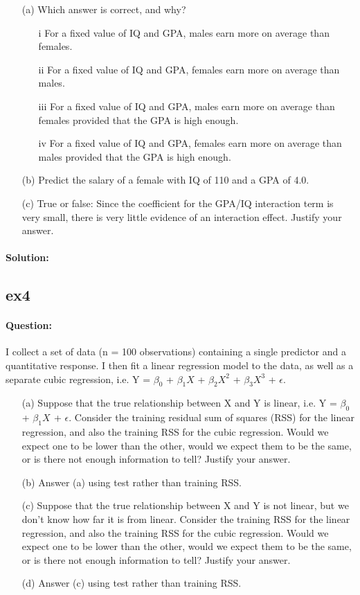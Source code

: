 \documentclass[a4paper,12pt,titlepage]{article} %
\begin{document}
\begin{itemize}
	\item[(a)] Which answer is correct, and why?
	\begin{itemize}
		\item[i] For a fixed value of IQ and GPA, males earn more on average than females.
		\item[ii] For a fixed value of IQ and GPA, females earn more on average than males.
		\item[iii] For a fixed value of IQ and GPA, males earn more on average than females provided that the GPA is high enough.
		\item[iv] For a fixed value of IQ and GPA, females earn more on average than males provided that the GPA is high enough.
	\end{itemize}
	\item[(b)] Predict the salary of a female with IQ of 110 and a GPA of 4.0.
	\item[(c)] True or false: Since the coefficient for the GPA/IQ interaction term is very small, there is very little evidence of an interaction effect. Justify your answer.
\end{itemize}

\paragraph{Solution:}

\subsection{ex4}
\paragraph{Question:} I collect a set of data (n = 100 observations) containing a single
predictor and a quantitative response. I then fit a linear regression model to the data, as well as a separate cubic regression, i.e. Y = $\beta_{0}$ + $\beta_{1} X$ + $\beta_{2} X^{2}$ + $\beta_{3} X^{3}$ + $\epsilon$.

\begin{itemize}
	\item[(a)] Suppose that the true relationship between X and Y is linear, i.e. Y = $\beta_{0}$ + $\beta_{1} X^{}$ + $\epsilon$. Consider the training residual sum of squares (RSS) for the linear regression, and also the training RSS for the cubic regression. Would we expect one to be lower than the other, would we expect them to be the same, or is there not enough information to tell? Justify your answer.
	\item[(b)] Answer (a) using test rather than training RSS.
	\item[(c)] Suppose that the true relationship between X and Y is not linear, but we don't know how far it is from linear. Consider the training RSS for the linear regression, and also the training RSS for the cubic regression. Would we expect one to be lower than the
	other, would we expect them to be the same, or is there not enough information to tell? Justify your answer.
	\item[(d)] Answer (c) using test rather than training RSS.
\end{itemize}
\end{document}
